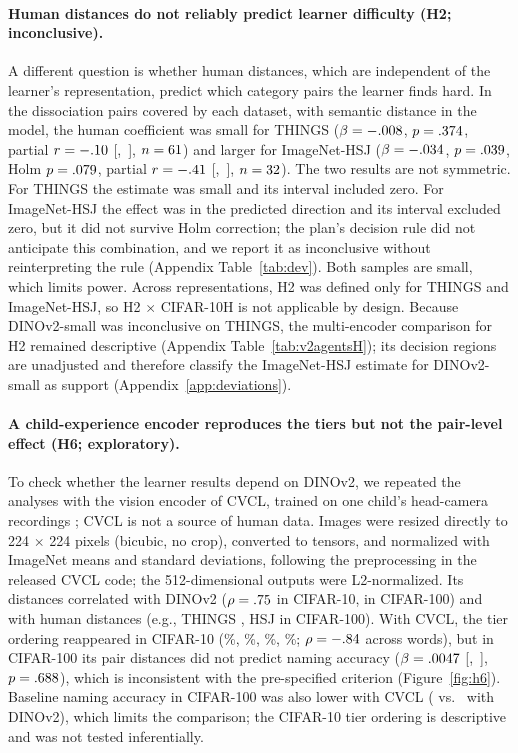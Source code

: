 \documentclass[11pt]{article}
\begin{document}
\paragraph{Human distances do not reliably predict learner difficulty (H2; inconclusive).} A different question is whether human distances, which are independent of the learner's representation, predict which category pairs the learner finds hard. In the dissociation pairs covered by each dataset, with semantic distance in the model, the human coefficient was small for THINGS ($\beta = -.008$, $p = .374$, partial $r = -.10$ [\HTwoThingsRLo,~\HTwoThingsRHi], $n = 61$) and larger for ImageNet-HSJ ($\beta = -.034$, $p = .039$, Holm $p = .079$, partial $r = -.41$ [\HTwoHsjRLo,~\HTwoHsjRHi], $n = 32$). The two results are not symmetric. For THINGS the estimate was small and its interval included zero. For ImageNet-HSJ the effect was in the predicted direction and its interval excluded zero, but it did not survive Holm correction; the plan's decision rule did not anticipate this combination, and we report it as inconclusive without reinterpreting the rule (Appendix Table~\ref{tab:dev}). Both samples are small, which limits power. Across representations, H2 was defined only for THINGS and ImageNet-HSJ, so H2 $\times$ CIFAR-10H is not applicable by design. Because DINOv2-small was inconclusive on THINGS, the multi-encoder comparison for H2 remained descriptive (Appendix Table~\ref{tab:v2agentsH}); its decision regions are unadjusted and therefore classify the ImageNet-HSJ estimate for DINOv2-small as support (Appendix~\ref{app:deviations}).


\paragraph{A child-experience encoder reproduces the tiers but not the pair-level effect (H6; exploratory).} To check whether the learner results depend on DINOv2, we repeated the analyses with the vision encoder of CVCL, trained on one child's head-camera recordings \parencite{vong2024}; CVCL is not a source of human data. Images were resized directly to 224 $\times$ 224 pixels (bicubic, no crop), converted to tensors, and normalized with ImageNet means and standard deviations, following the preprocessing in the released CVCL code; the 512-dimensional outputs were L2-normalized. Its distances correlated with DINOv2 ($\rho = .75$ in CIFAR-10, \HSixRhoHundred{} in CIFAR-100) and with human distances (e.g., THINGS \HSixThingsHundred, HSJ \HSixHsjHundred{} in CIFAR-100). With CVCL, the tier ordering reappeared in CIFAR-10 (\CvclNative\%, \CvclNear\%, \CvclMid\%, \CvclFar\%; $\rho = -.84$ across words), but in CIFAR-100 its pair distances did not predict naming accuracy ($\beta = .0047$ [\HSixLo,~\HSixHi], $p = .688$), which is inconsistent with the pre-specified criterion (Figure~\ref{fig:h6}). Baseline naming accuracy in CIFAR-100 was also lower with CVCL (\HSixBaseCvcl{} vs.\ \HSixBaseDino{} with DINOv2), which limits the comparison; the CIFAR-10 tier ordering is descriptive and was not tested inferentially.
\end{document}
